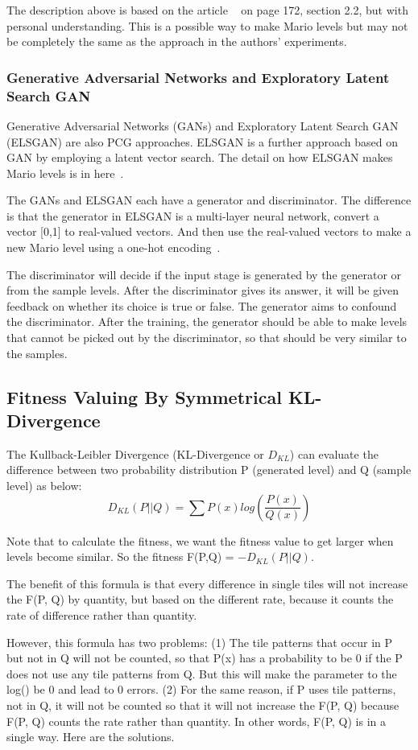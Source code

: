 \documentclass[runningheads]{llncs}
\begin{document}
The description above is based on the article ~\cite{ref_lncs1} on page 172, section 2.2, but with personal understanding. This is a possible way to make Mario levels but may not be completely the same as the approach in the authors' experiments.

\subsubsection{Generative Adversarial Networks and  Exploratory Latent Search GAN}
Generative Adversarial Networks (GANs) and  Exploratory Latent Search GAN (ELSGAN) are also PCG approaches. ELSGAN is a further approach based on GAN by employing a latent vector search. The detail on how ELSGAN makes Mario levels is in here~\cite{ref_lncs2}.

The GANs and ELSGAN each have a generator and discriminator. The difference is that the generator in ELSGAN is a  multi-layer neural network, convert a vector [0,1] to real-valued vectors. And then use the real-valued vectors to make a new Mario level using a one-hot encoding~\cite{ref_lncs2}. 

The discriminator will decide if the input stage is generated by the generator or from the sample levels. After the discriminator gives its answer, it will be given feedback on whether its choice is true or false. The generator aims to confound the discriminator. After the training, the generator should be able to make levels that cannot be picked out by the discriminator, so that should be very similar to the samples.

\subsection{Fitness Valuing By Symmetrical KL-Divergence}
The Kullback-Leibler Divergence (KL-Divergence or \(D_{KL} \)) can evaluate the difference between two probability distribution P (generated level) and Q (sample level) as below: 
\[D_{KL}(P||Q) = \sum P(x)log(\frac{P(x)}{Q(x)})\]

Note that to calculate the fitness, we want the fitness value to get larger when levels become similar. So the fitness F(P,Q) = \(-D_{KL}(P||Q) \).

The benefit of this formula is that every difference in single tiles will not increase the F(P, Q) by quantity, but based on the different rate, because it counts the rate of difference rather than quantity.

However, this formula has two problems: (1) The tile patterns that occur in P but not in Q will not be counted, so that P(x) has a probability to be 0 if the P does not use any tile patterns from Q. But this will make the parameter to the log() be 0 and lead to 0 errors. (2) For the same reason, if P uses tile patterns, not in Q, it will not be counted so that it will not increase the F(P, Q) because F(P, Q) counts the rate rather than quantity. In other words, F(P, Q) is in a single way. Here are the solutions.
\end{document}
